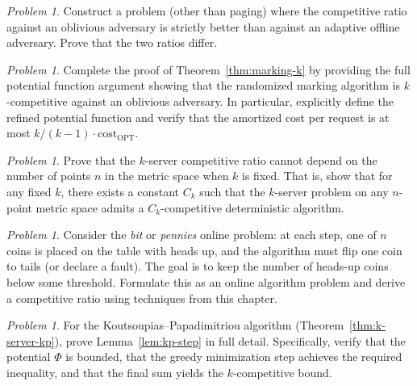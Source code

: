 \documentclass[twoside,12pt]{book}
\theoremstyle{plain}
\theoremstyle{definition}
\theoremstyle{remark}
\newtheorem{problem}[theorem]{Problem}
\begin{document}
\begin{problem}\label{prob:oblivious-vs-adaptive}
Construct a problem (other than paging) where the competitive ratio
against an oblivious adversary is strictly better than against an
adaptive offline adversary.  Prove that the two ratios differ.
\end{problem}

\begin{problem}\label{prob:marking-analysis}
Complete the proof of Theorem~\ref{thm:marking-k} by providing the full
potential function argument showing that the randomized marking algorithm
is $k$-competitive against an oblivious adversary.  In particular,
explicitly define the refined potential function and verify that the
amortized cost per request is at most $k/(k-1) \cdot
\mathrm{cost}_{\mathrm{OPT}}$.
\end{problem}

\begin{problem}\label{prob:k-server-metric}
Prove that the $k$-server competitive ratio cannot depend on the number
of points $n$ in the metric space when $k$ is fixed.  That is, show
that for any fixed $k$, there exists a constant $C_k$ such that the
$k$-server problem on any $n$-point metric space admits a $C_k$-competitive
deterministic algorithm.
\end{problem}

\begin{problem}\label{prob:bit-packing}
Consider the \emph{bit} or \emph{pennies} online problem: at each step,
one of $n$ coins is placed on the table with heads up, and the
algorithm must flip one coin to tails (or declare a fault).  The goal is
to keep the number of heads-up coins below some threshold.  Formulate
this as an online algorithm problem and derive a competitive ratio using
techniques from this chapter.
\end{problem}

\begin{problem}\label{prob:kp-potential}
For the Koutsoupias--Papadimitriou algorithm
(Theorem~\ref{thm:k-server-kp}), prove Lemma~\ref{lem:kp-step} in full
detail.  Specifically, verify that the potential $\Phi$ is bounded, that
the greedy minimization step achieves the required inequality, and that
the final sum yields the $k$-competitive bound.
\end{problem}
\end{document}
